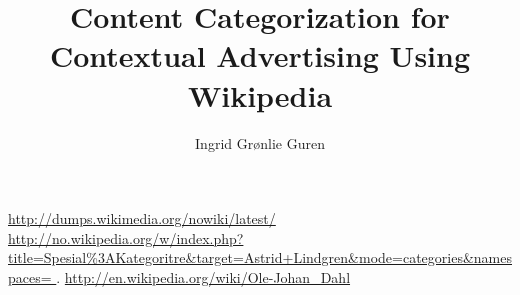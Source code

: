\documentclass[a4paper,english]{book}
\title{Content Categorization for Contextual Advertising Using Wikipedia}
\author{Ingrid Grønlie Guren}
\begin{document}

\ififorside
\frontmatter{}
\maketitle{}


\urldef\nowikidump\url{http://dumps.wikimedia.org/nowiki/latest/}
\urldef\categorytree\url{http://no.wikipedia.org/w/index.php?title=Spesial%3AKategoritre&target=Astrid+Lindgren&mode=categories&namespaces= }.
\urldef\olejohandahleng\url{http://en.wikipedia.org/wiki/Ole-Johan_Dahl}



  
\tableofcontents{}
\listoffigures{}
\listoftables{}

\mainmatter{}













\end{document}
